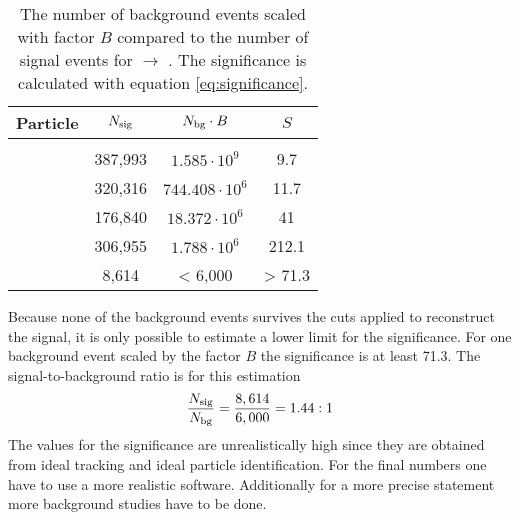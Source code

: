 \begin{table}
	\centering
	\caption{\propose The number of background events scaled with factor $B$ compared to the number of signal events for \pbarp $\rightarrow$ \excitedcascade \anticascade.
		The significance is calculated with equation \ref{eq:significance}.}
	\label{bg_compared_reco_with_scaling}
	\begin{tabular}{lccc}
		\hline
		Particle & $N_{\textnormal{sig}}$ & $N_{\textnormal{bg}} \cdot B$ & $S$\\
		\hline
		\hline
		& & &\\
		\lam & 387,993 &$ 1.585 \cdot 10^{9}$& 9.7\\
		\alam & 320,316 & $ 744.408 \cdot 10^{6}$ & 11.7\\
		\anticascade & 176,840 & $ 18.372 \cdot 10^{6}$ & 41\\
		\excitedcascade &306,955  & $ 1.788 \cdot 10^{6}$& 212.1\\
		\excitedcascade \anticascade &  8,614 & < 6,000 & > 71.3\\
		\hline
		 
		  
	\end{tabular}
\end{table}
Because none of the background events survives the cuts applied to reconstruct the signal, it is only possible to estimate a lower limit for the significance.
For one background event scaled by the factor $B$ the significance is at least 71.3.
The signal-to-background ratio is for this estimation
\begin{equation}
	\nonumber
	\frac{N_{\textnormal{sig}}}{N_{\textnormal{bg}}} = \frac{8,614} {6,000} = 1.44 : 1
\end{equation}
The values for the significance are unrealistically high since they are obtained from ideal tracking and ideal particle identification.
For the final numbers one have to use a more realistic software.
Additionally for a more precise statement more background studies have to be done.
 
	